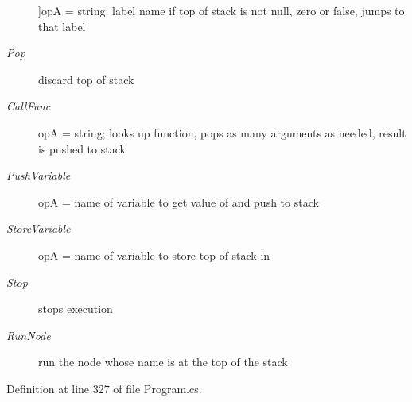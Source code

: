 \begin{Desc}
\begin{description}
{}]op\-A = string\-: label name if top of stack is not null, zero or false, jumps to that label \item[{\em 
\hypertarget{a00050_ad5dfb6ee68ca7469623ad3e459f98894a0ae61bd0474e04c9f1195d4baa0213a0}{Pop}\label{a00050_ad5dfb6ee68ca7469623ad3e459f98894a0ae61bd0474e04c9f1195d4baa0213a0}
}]discard top of stack \item[{\em 
\hypertarget{a00050_ad5dfb6ee68ca7469623ad3e459f98894a3b5e7e8300dc6e4b78cb865c5b10f01a}{Call\-Func}\label{a00050_ad5dfb6ee68ca7469623ad3e459f98894a3b5e7e8300dc6e4b78cb865c5b10f01a}
}]op\-A = string; looks up function, pops as many arguments as needed, result is pushed to stack \item[{\em 
\hypertarget{a00050_ad5dfb6ee68ca7469623ad3e459f98894ab8c46f65015a178516fadbb5ad6c2038}{Push\-Variable}\label{a00050_ad5dfb6ee68ca7469623ad3e459f98894ab8c46f65015a178516fadbb5ad6c2038}
}]op\-A = name of variable to get value of and push to stack \item[{\em 
\hypertarget{a00050_ad5dfb6ee68ca7469623ad3e459f98894a872dc050abaff4beb46e70dadd4088c2}{Store\-Variable}\label{a00050_ad5dfb6ee68ca7469623ad3e459f98894a872dc050abaff4beb46e70dadd4088c2}
}]op\-A = name of variable to store top of stack in \item[{\em 
\hypertarget{a00050_ad5dfb6ee68ca7469623ad3e459f98894a11a755d598c0c417f9a36758c3da7481}{Stop}\label{a00050_ad5dfb6ee68ca7469623ad3e459f98894a11a755d598c0c417f9a36758c3da7481}
}]stops execution \item[{\em 
\hypertarget{a00050_ad5dfb6ee68ca7469623ad3e459f98894ae956bcf888278c168ee9b106927ff6ac}{Run\-Node}\label{a00050_ad5dfb6ee68ca7469623ad3e459f98894ae956bcf888278c168ee9b106927ff6ac}
}]run the node whose name is at the top of the stack \end{description}
\end{Desc}


Definition at line 327 of file Program.\-cs.


